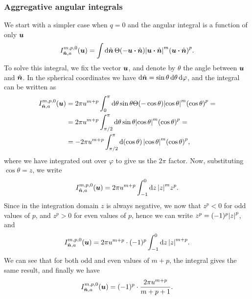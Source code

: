\documentclass[aps,prl,preprint,groupedaddress,10pt]{revtex4-2}
\begin{document}
\subsubsection{Aggregative angular integrals}
We start with a simpler case when $q=0$ and the angular integral is a function of only $\vb*{u}$
\begin{equation}
    I_{\bn,a}^{m,p,0}(\bu)=\int\dd{\bn}\Theta\pqty{-\bu\vdot\bn}
    \abs{\bu\vdot\bn}^m\pqty{\bu\vdot\bn}^p.
\end{equation}
To solve this integral, we fix the vector $\vb*{u}$, and denote by $\theta$ the angle between
$\vb*{u}$ and $\hat{\vb*{n}}$. In the spherical coordinates we have
$\dd{\hat{\vb*{n}}}=\sin\theta\dd{\theta}\dd{\varphi}$, and the integral can be written as
\begin{equation}
    \begin{split}
        I_{\bn,a}^{m,p,0}(\bu)&=2\pi u^{m+p}\int_0^{\pi}\dd{\theta}\sin\theta
        \Theta\pqty{-\cos\theta}\abs{\cos\theta}^m\pqty{\cos\theta}^p=\\
        &=2\pi u^{m+p}\int_{\pi/2}^{\pi}\dd{\theta}\sin\theta
        \abs{\cos\theta}^m\pqty{\cos\theta}^p=\\
        &=-2\pi u^{m+p}\int_{\pi/2}^{\pi}\dd{\pqty{\cos\theta}}
        \abs{\cos\theta}^m\pqty{\cos\theta}^p,
    \end{split}
\end{equation}
where we have integrated out over $\varphi$ to give us the $2\pi$ factor. Now, substituting
$\cos\theta=z$, we write
\begin{equation}
    I_{\hat{\vb*{n}},a}^{m,p,0}(\vb*{u})=2\pi u^{m+p}\int_{-1}^{0}\dd{z}\abs{z}^m z^p.
\end{equation}
Since in the integration domain $z$ is always negative, we now that $z^p<0$ for odd values of
$p$, and $z^p>0$ for even values of $p$, hence we can write $z^p=(-1)^p\abs{z}^p$, and
\begin{equation}
    I_{\hat{\vb*{n}},a}^{m,p,0}(\vb*{u})=2\pi u^{m+p}\cdot(-1)^p\int_{-1}^{0}\dd{z}\abs{z}^{m+p}.
\end{equation}
We can see that for both odd and even values of $m+p$, the integral gives the same result,
and finally we have
\begin{equation}
    I_{\hat{\vb*{n}},a}^{m,p,0}(\vb*{u})=(-1)^p\cdot\frac{2\pi u^{m+p}}{m+p+1}.
\end{equation}
\end{document}
